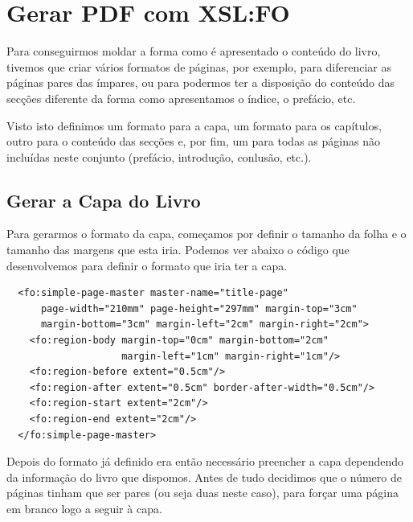 \documentclass[a4paper]{article}
\begin{document}
\newpage

\section{\LARGE Gerar PDF com XSL:FO}

\hspace{1cm}Para conseguirmos moldar a forma como é apresentado o conteúdo do livro, tivemos que criar vários formatos de páginas, por exemplo, para diferenciar as páginas pares das ímpares, ou para podermos ter a disposição do conteúdo das secções diferente da forma como apresentamos o índice, o prefácio, etc.

\hspace{1cm}Visto isto definimos um formato para a capa, um formato para os capítulos, outro para o conteúdo das secções e, por fim, um para todas as páginas não incluídas neste conjunto (prefácio, introdução, conlusão, etc.).\\


\subsection{\large Gerar a Capa do Livro}

\hspace{1cm}Para gerarmos o formato da capa, começamos por definir o tamanho da folha e o tamanho das margens que esta iria. Podemos ver abaixo o código que desenvolvemos para definir o formato que iria ter a capa.\\
  
\begin{small}
\begin{lstlisting}
  <fo:simple-page-master master-name="title-page" 
      page-width="210mm" page-height="297mm" margin-top="3cm"
      margin-bottom="3cm" margin-left="2cm" margin-right="2cm">
    <fo:region-body margin-top="0cm" margin-bottom="2cm" 
                    margin-left="1cm" margin-right="1cm"/>
    <fo:region-before extent="0.5cm"/>
    <fo:region-after extent="0.5cm" border-after-width="0.5cm"/>
    <fo:region-start extent="2cm"/>
    <fo:region-end extent="2cm"/>
  </fo:simple-page-master>
\end{lstlisting}
\end{small}

\hspace{1cm}Depois do formato já definido era então necessário preencher a capa dependendo da informação do livro que dispomos. Antes de tudo decidimos que o número de páginas tinham que ser pares (ou seja duas neste caso), para forçar uma página em branco logo a seguir à capa.\\
\end{document}
